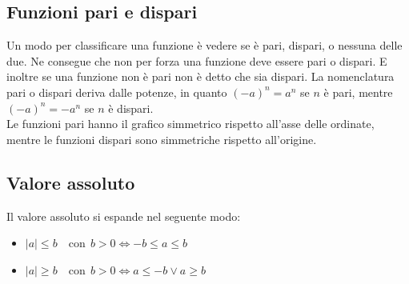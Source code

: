\subsection{Funzioni pari e dispari}
Un modo per classificare una funzione è vedere se è pari, dispari, o nessuna delle due. Ne consegue che non per forza una funzione deve essere pari o dispari. E inoltre se una funzione non è pari non è detto che sia dispari.
La nomenclatura pari o dispari deriva dalle potenze, in quanto $(-a)^n = a^n$ se $n$ è pari, mentre $(-a)^n = -a^n$ se $n$ è dispari.\\

Le funzioni pari hanno il grafico simmetrico rispetto all'asse delle ordinate, mentre le funzioni dispari sono simmetriche rispetto all'origine.

\subsection{Valore assoluto}


Il valore assoluto si espande nel seguente modo:
\begin{itemize}
    \item $|a| \leq b \quad \mathrm{con}\;\, b > 0 \iff -b \leq a \leq b$
    \item $|a| \geq b \quad \mathrm{con}\;\, b > 0 \iff a \leq -b \lor a \geq b$
\end{itemize}

